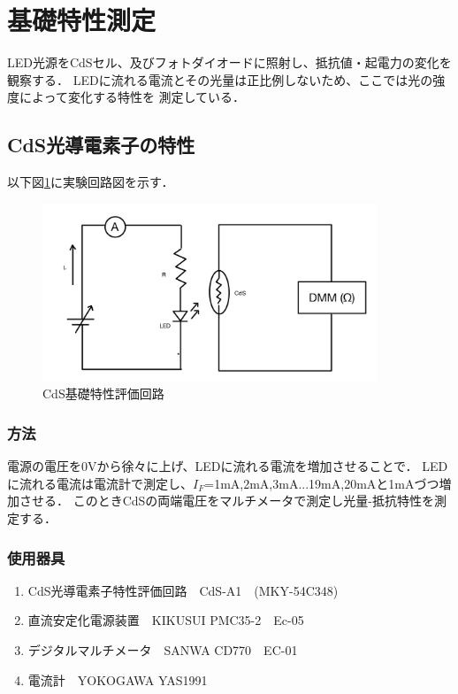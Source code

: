 \documentclass[titlepage]{jarticle}
\begin{document}
\section{基礎特性測定}
LED光源をCdSセル、及びフォトダイオードに照射し、抵抗値・起電力の変化を観察する．
LEDに流れる電流とその光量は正比例しないため、ここでは光の強度によって変化する特性を
測定している．
\subsection{CdS光導電素子の特性}
以下図\ref{fig:CdS基礎特性評価回路}に実験回路図を示す．

\begin{figure}[H]
    \begin{center}
        \includegraphics[width=10cm]{image/1.jpg}
        \caption{CdS基礎特性評価回路}
        \label{fig:CdS基礎特性評価回路}
    \end{center}
\end{figure}

\subsubsection{方法}
電源の電圧を0Vから徐々に上げ、LEDに流れる電流を増加させることで．
LEDに流れる電流は電流計で測定し、$I_F$=1mA,2mA,3mA...19mA,20mAと1mAづつ増加させる．
このときCdSの両端電圧をマルチメータで測定し光量-抵抗特性を測定する．

\subsubsection{使用器具}
\begin{enumerate}
    \item CdS光導電素子特性評価回路　CdS-A1　(MKY-54C348)
    \item 直流安定化電源装置　KIKUSUI PMC35-2　Ec-05
    \item デジタルマルチメータ　SANWA CD770　EC-01
    \item 電流計　YOKOGAWA YAS1991
\end{enumerate}
\end{document}
